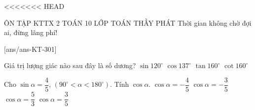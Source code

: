 <<<<<<< HEAD
\def\tenchude{ÔN TẬP KTTX 2}
\begin{name}
	{\tenchude}
	{TOÁN 10}
	{LỚP TOÁN THẦY PHÁT}
	{Thời gian không chờ đợi ai, đừng lãng phí!}
\end{name}

\setcounter{ex}{0}\setcounter{ex}{0}
[ans/ans-KT-301]

\begin{ex}
	Giá trị lượng giác nào sau đây là số dương?
	\choice
	{\True $\sin 120^\circ$}
	{$\cos 137^\circ$}
	{$\tan 160^\circ$}
	{$\cot 160^\circ$}
\end{ex}

\begin{ex}
	Cho $\sin\alpha=\dfrac{4}{5}$, $\left(90^\circ<\alpha <180^\circ\right)$. Tính $\cos\alpha $.
	\choice
	{$\cos\alpha=-\dfrac{4}{5}$}
	{\True $\cos\alpha=-\dfrac{3}{5}$}
	{$\cos\alpha=\dfrac{5}{3}$}
	{$\cos\alpha=\dfrac{3}{5}$}
\end{ex}

